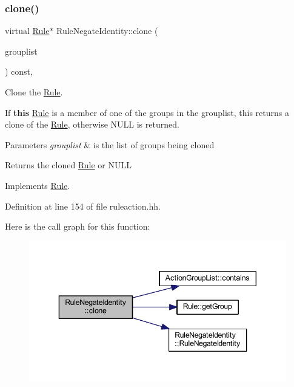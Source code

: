 \subsubsection{\texorpdfstring{clone()}{clone()}}
{\footnotesize\ttfamily virtual \mbox{\hyperlink{class_rule}{Rule}}$\ast$ Rule\+Negate\+Identity\+::clone (\begin{DoxyParamCaption}\item[{const \mbox{\hyperlink{class_action_group_list}{Action\+Group\+List}} \&}]{grouplist }\end{DoxyParamCaption}) const\hspace{0.3cm}{\ttfamily [inline]}, {\ttfamily [virtual]}}



Clone the \mbox{\hyperlink{class_rule}{Rule}}. 

If {\bfseries{this}} \mbox{\hyperlink{class_rule}{Rule}} is a member of one of the groups in the grouplist, this returns a clone of the \mbox{\hyperlink{class_rule}{Rule}}, otherwise N\+U\+LL is returned. 
\begin{DoxyParams}{Parameters}
{\em grouplist} & is the list of groups being cloned \\
\hline
\end{DoxyParams}
\begin{DoxyReturn}{Returns}
the cloned \mbox{\hyperlink{class_rule}{Rule}} or N\+U\+LL 
\end{DoxyReturn}


Implements \mbox{\hyperlink{class_rule_a70de90a76461bfa7ea0b575ce3c11e4d}{Rule}}.



Definition at line 154 of file ruleaction.\+hh.

Here is the call graph for this function\+:
\nopagebreak
\begin{figure}[H]
\begin{center}
\leavevmode
\includegraphics[width=343pt]{class_rule_negate_identity_a359bedbb109cb97b3d27577486a51a7b_cgraph}
\end{center}
\end{figure}
\mbox{\label{class_rule_negate_identity_a7e6f7cc4b064dbb504527dcebe07e290}} 
